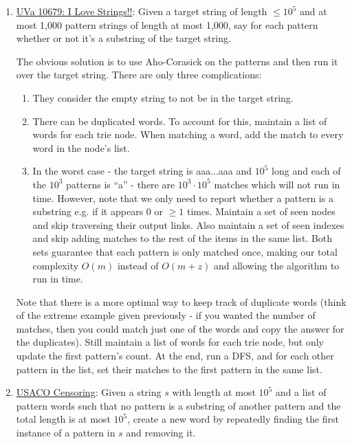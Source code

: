 \documentclass[11pt, oneside]{article}
\begin{document}
\begin{enumerate}

  \item \href{https://onlinejudge.org/index.php?option=onlinejudge&page=show_problem&problem=1620}{UVa 10679: I Love Strings!!}:
  Given a target string of length \( \leq 10^5 \) and at most 1,000 pattern strings of length at most 1,000, say for each pattern
  whether or not it's a substring of the target string.

  The obvious solution is to use Aho-Corasick on the patterns and then run it over the target string.
  There are only three complications:
  \begin{enumerate}
    \item They consider the empty string to not be in the target string.
    \item There can be duplicated words. To account for this, maintain a list of words for each trie node.
    When matching a word, add the match to every word in the node's list.
    \item In the worst case - the target string is aaa...aaa and \( 10^5 \) long and each of the \( 10^3 \) patterns is ``a'' -
    there are \( 10^3 \cdot 10^5 \) matches which will not run in time. However, note that we only need to report
    whether a pattern is a substring e.g. if it appears 0 or \( \geq 1 \) times. Maintain a set of seen nodes and skip traversing their output links.
    Also maintain a set of seen indexes and skip adding matches to the rest of the items in the same list.
    Both sets guarantee that each pattern is only matched once, making our total complexity  \( O(m) \) instead
    of \( O(m + z) \) and allowing the algorithm to run in time.
  \end{enumerate}

  Note that there is a more optimal way to keep track of duplicate words
  (think of the extreme example given previously - if you wanted the number of matches,
  then you could match just one of the words and copy the answer for the duplicates).
  Still maintain a list of words for each trie node, but only update the first pattern's count.
  At the end, run a DFS, and for each other pattern in the list, set their matches to the first pattern in the same list.

  \item \href{http://www.usaco.org/index.php?page=viewproblem2&cpid=533}{USACO Censoring}:
  Given a string \( s \) with length at most \( 10^5 \) and a list of pattern words such that no pattern
  is a substring of another pattern and the total length is at most \( 10^5 \), create a new word
  by repeatedly finding the first instance of a pattern in \( s \) and removing it.


\end{enumerate}
\end{document}
